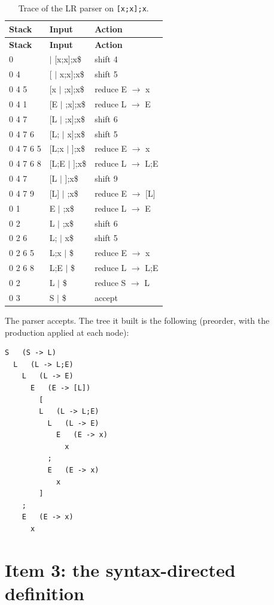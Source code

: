 \documentclass[11pt,letterpaper]{article}
\newcommand{\nt}[1]{\texttt{#1}}
\begin{document}
\begin{longtable}{@{}lll@{}}
\caption{Trace of the LR parser on \nt{[x;x];x}.}\label{tab:traza}\\
\toprule
\textbf{Stack} & \textbf{Input} & \textbf{Action}\\
\midrule
\endfirsthead
\toprule
\textbf{Stack} & \textbf{Input} & \textbf{Action}\\
\midrule
\endhead
\bottomrule
\endfoot
\scriptsize
0 & $\mid$ [x;x];x\$ & shift 4 \\
0 4 & [ $\mid$ x;x];x\$ & shift 5 \\
0 4 5 & [x $\mid$ ;x];x\$ & reduce E $\to$ x \\
0 4 1 & [E $\mid$ ;x];x\$ & reduce L $\to$ E \\
0 4 7 & [L $\mid$ ;x];x\$ & shift 6 \\
0 4 7 6 & [L; $\mid$ x];x\$ & shift 5 \\
0 4 7 6 5 & [L;x $\mid$ ];x\$ & reduce E $\to$ x \\
0 4 7 6 8 & [L;E $\mid$ ];x\$ & reduce L $\to$ L;E \\
0 4 7 & [L $\mid$ ];x\$ & shift 9 \\
0 4 7 9 & [L] $\mid$ ;x\$ & reduce E $\to$ [L] \\
0 1 & E $\mid$ ;x\$ & reduce L $\to$ E \\
0 2 & L $\mid$ ;x\$ & shift 6 \\
0 2 6 & L; $\mid$ x\$ & shift 5 \\
0 2 6 5 & L;x $\mid$ \$ & reduce E $\to$ x \\
0 2 6 8 & L;E $\mid$ \$ & reduce L $\to$ L;E \\
0 2 & L $\mid$ \$ & reduce S $\to$ L \\
0 3 & S $\mid$ \$ & accept \\
\end{longtable}

The parser accepts. The tree it built is the following (preorder, with the production applied at
each node):

\begin{lstlisting}[style=codigo]
S   (S -> L)
  L   (L -> L;E)
    L   (L -> E)
      E   (E -> [L])
        [
        L   (L -> L;E)
          L   (L -> E)
            E   (E -> x)
              x
          ;
          E   (E -> x)
            x
        ]
    ;
    E   (E -> x)
      x
\end{lstlisting}

\section{Item 3: the syntax-directed definition}
\end{document}
